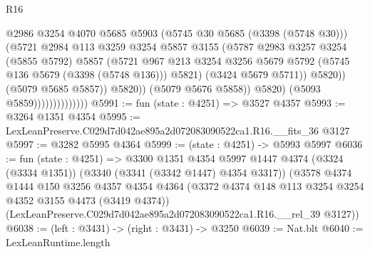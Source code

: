 \begin{lexlean}{R16}
\begin{coremodule}
                                          @2986
                                          @3254
                                          @4070
                                          @5685
                                          @5903
                                          (@5745 @30 @5685 (@3398 (@5748 @30)))
                                          (@5721
                                            @2984
                                            @113
                                            @3259
                                            @3254
                                            @5857
                                            @3155
                                            (@5787
                                              @2983
                                              @3257
                                              @3254
                                              (@5855 @5792)
                                              @5857
                                              (@5721
                                                @967
                                                @213
                                                @3254
                                                @3256
                                                @5679
                                                @5792
                                                (@5745 @136 @5679 (@3398 (@5748 @136)))
                                                @5821)
                                              (@3424 @5679 @5711))
                                            @5820))
                                        (@5079 @5685 @5857))
                                      @5820))
                                  (@5079 @5676 @5858))
                                @5820)
                              (@5093 @5859))))))))))))))
@5991 := fun (state : @4251) => @3527 @4357
@5993 := @3264 @1351 @4354
@5995 := LexLeanPreserve.C029d7d042ae895a2d072083090522ca1.R16.__fits_36 @3127
@5997 := @3282 @5995 @4364
@5999 := (state : @4251) -> @5993 @5997
@6036 := fun (state : @4251) =>
  @3300
    @1351
    @4354
    @5997
    @1447
    @4374
    (@3324 (@3334 @1351))
    (@3340 (@3341 (@3342 @1447) @4354 @3317))
    (@3578
      @4374
      @1444
      @150
      @3256
      @4357
      @4354
      @4364
      (@3372 @4374 @148 @113 @3254 @3254 @4352 @3155 @4473 (@3419 @4374))
      (LexLeanPreserve.C029d7d042ae895a2d072083090522ca1.R16.__rel_39 @3127))
@6038 := (left : @3431) -> (right : @3431) -> @3250
@6039 := Nat.blt
@6040 := LexLeanRuntime.length

\end{coremodule}
\end{lexlean}
